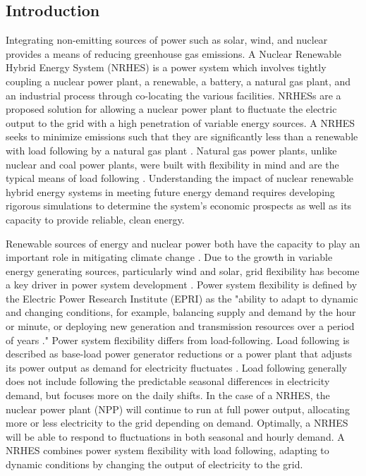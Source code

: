 \documentclass{article}                                                                           %
\begin{document}
\begin{linenumbers}
\section{Introduction}
Integrating non-emitting sources of power such as solar, wind, and nuclear provides a means of reducing greenhouse gas emissions. A Nuclear Renewable Hybrid Energy System (NRHES) is a power system which involves tightly coupling a nuclear power plant, a renewable, a battery, a natural gas plant, and an industrial process through co-locating the various facilities.  NRHESs are a proposed solution for allowing a nuclear power plant to fluctuate the electric output to the grid with a high penetration of variable energy sources. A NRHES seeks to minimize emissions such that they are significantly less than a renewable with load following by a natural gas plant \cite{Baker2016}.  Natural gas power plants, unlike nuclear and coal power plants, were built with flexibility in mind and are the typical means of load following \cite{MITEnergyInitiative2011}.  Understanding the impact of nuclear renewable hybrid energy systems in meeting future energy demand requires developing rigorous simulations to determine the system's economic prospects as well as its capacity to provide reliable, clean energy.

Renewable sources of energy and nuclear power both have the capacity to play an important role in mitigating climate change \cite {IPCC}. Due to the growth in variable energy generating sources, particularly wind and solar, grid flexibility has become a key driver in power system development \cite {Denholm2011}. Power system flexibility is defined by the Electric Power Research Institute (EPRI) as the "ability to adapt to dynamic and changing conditions, for example, balancing supply and demand by the hour or minute, or deploying new generation and transmission resources over a period of years \cite{EPRI2016}." Power system flexibility differs from load-following.  Load following is described as base-load power generator reductions \cite{Bragg-Sitton2014} or a power plant that adjusts its power output as demand for electricity fluctuates \cite{Masters2004}. Load following generally does not include following the predictable seasonal differences in electricity demand, but focuses more on the daily shifts. In the case of a NRHES, the nuclear power plant (NPP) will continue to run at full power output, allocating more or less electricity to the grid depending on demand.   Optimally, a NRHES will be able to respond to fluctuations in both seasonal and hourly demand. A NRHES combines power system flexibility with load following, adapting to dynamic conditions by changing the output of electricity to the grid.


\end{linenumbers}
\end{document}
